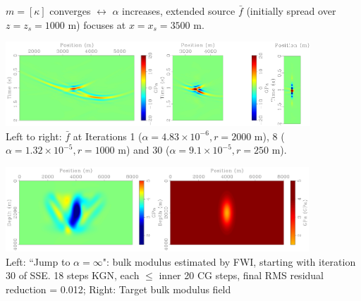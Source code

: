 \documentclass[xcolor=dvipsnames,12pt,aspectratio=169]{beamer}
\newcommand{\of}{\bar{f}}
\begin{document}
\begin{frame}
$m=[\kappa]$ converges $\leftrightarrow$ $\alpha$ increases, extended source $\of$ (initially spread over $z=z_s=1000$ m) {\color{blue} focuses} at $x=x_s=3500$ m.
\begin{center}
\hspace{-1cm}\includegraphics[height=1.25in]{Fig/cgw1estsourceplh0.pdf}\includegraphics[height=1.25in]{Fig/cgw7estsourceplh0.pdf}\includegraphics[height=1.25in]{Fig/cgw29estsourceplh0.pdf}\\
\vspace{0.25in}
Left to right: $\of$ at Iterations 1 ($\alpha=4.83 \times 10^{-6}, r=2000$ m), 8 ($\alpha= 1.32 \times 10^{-5}, r=1000$ m) and 30 ($\alpha=9.1 \times 10^{-5}, r=250$ m).
\end{center}
\end{frame}

\begin{frame}
\begin{center}
\includegraphics[height=1.25in]{Fig/fwitrsse1bulkmodinvlh0.pdf}\includegraphics[height=1.25in]{Fig/bml0.pdf}\\
\vspace{0.25in}
Left: ``Jump to $\alpha=\infty$": bulk modulus estimated by FWI, starting with iteration 30 of SSE. 18 steps KGN, each $\le$ inner 20 CG steps, final RMS residual reduction = 0.012;
Right: Target bulk modulus field
\end{center}
\end{frame}
\end{document}
